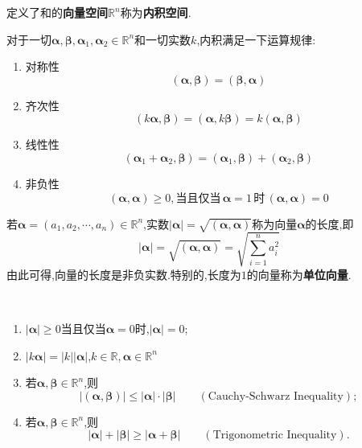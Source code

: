 \documentclass[9pt,a4paper]{book}
\begin{document}
\begin{defination}[内积空间的定义]
	定义了和的\textbf{向量空间}$ \mathbb{R}^n $称为\textbf{内积空间}.
\end{defination}
\begin{theorem}[向量内积运算规律]
	对于一切$ \bm{\alpha},\bm{\beta},\bm{\alpha}_1,\bm{\alpha}_2\in\mathbb{R}^n $和一切实数$ k $,内积满足一下运算规律:
	\begin{enumerate}
		\item 对称性\[(\bm{\alpha},\bm{\beta})=(\bm{\beta},\bm{\alpha})
		\]
		\item 齐次性\[(k\bm{\alpha},\bm{\beta})=(\bm{\alpha},k\bm{\beta})=k(\bm{\alpha},\bm{\beta})
		\]
		\item 线性性\[(\bm{\alpha}_1+\bm{\alpha}_2,\bm{\beta})=(\bm{\alpha}_1,\bm{\beta})+(\bm{\alpha}_2,\bm{\beta})
		\]
		\item 非负性\[(\bm{\alpha},\bm{\alpha})\geqslant0,\mbox{当且仅当}\,\bm{\alpha}=1\,\mbox{时}\,(\bm{\alpha},\bm{\alpha})=0
		\]
	\end{enumerate}
\end{theorem}
\begin{defination}[向量长度的定义]
	若$ \bm{\alpha}=(a_1,a_2,\cdots,a_n)\in\mathbb{R}^n $,实数$ |\bm{\alpha}|=\sqrt{(\bm{\alpha},\bm{\alpha})} $称为向量$ \bm{\alpha} $的长度,即\[
	|\bm{\alpha}|=\sqrt{(\bm{\alpha},\bm{\alpha})}=\sqrt{\sum_{i=1}^{n}{a^2_i}}
	\]由此可得,向量的长度是非负实数.特别的,长度为$ 1 $的向量称为\textbf{单位向量}.
\end{defination}
\begin{feature}
	\,\\
	\begin{enumerate}
		\item $ |\bm{\alpha}|\geqslant0 $当且仅当$ \bm{\alpha}=0 $时,$ |\bm{\alpha}|=0 $;
		\item $ |k\bm{\alpha}|=|k||\bm{\alpha}| $,$ k\in\mathbb{R},\bm{\alpha}\in\mathbb{R}^n $
		\item 若$ \bm{\alpha},\bm{\beta}\in\mathbb{R}^n $,则
			\[
			|(\bm{\alpha},\bm{\beta})|\leqslant|\bm{\alpha}|\cdot|\bm{\beta}|\qquad (\mbox{Cauchy-Schwarz Inequality});
			\]
		\item 若$ \bm{\alpha},\bm{\beta}\in\mathbb{R}^n $,则\[
		|\bm{\alpha}|+|\bm{\beta}|\geqslant|\bm{\alpha}+\bm{\beta}|\qquad (\mbox{Trigonometric Inequality}).
		\]
	\end{enumerate}
\end{feature}
\end{document}

